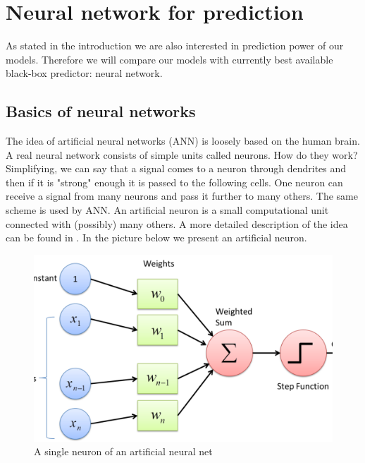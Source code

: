 \documentclass[num-refs]{wiley-article}
\begin{document}
\section{Neural network for prediction}

As stated in the introduction we are also interested in prediction power of our models. Therefore we will compare our models with currently best available black-box predictor: neural network.

\subsection{Basics of neural networks}

The idea of artificial neural networks (ANN) is loosely based on the human brain. A real neural network consists of simple units called neurons. How do they work? Simplifying, we can say that a signal comes to a neuron through dendrites and then if it is "strong" enough it is passed to the following cells. One neuron can receive a signal from many neurons and pass it further to many others. The same scheme is used by ANN. An artificial neuron is a small computational unit connected with (possibly) many others. A more detailed description of the idea can be found in \cite{NN}. In the picture below we present an artificial neuron.

\begin{figure}[H]
\centering
\includegraphics[width=\textwidth]{pictures/perceptron.png}
\caption{A single neuron of an artificial neural net}
\end{figure}
\end{document}

